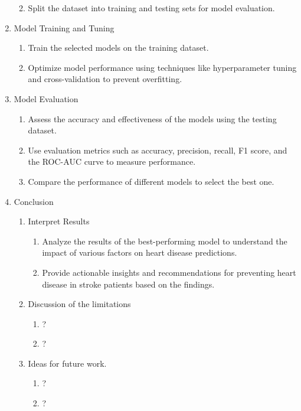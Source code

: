 \documentclass[runningheads]{llncs}
\begin{document}
\begin{enumerate}
\begin{enumerate}
\begin{enumerate}
            \end{enumerate}
        \item Split the dataset into training and testing sets for model evaluation. 
    \end{enumerate}
\item Model Training and Tuning
    \begin{enumerate}
        \item Train the selected models on the training dataset. 
        \item Optimize model performance using techniques like hyperparameter tuning and cross-validation to prevent overfitting. 
    \end{enumerate}
\item Model Evaluation
\begin{enumerate}
    \item Assess the accuracy and effectiveness of the models using the testing dataset. 
    \item Use evaluation metrics such as accuracy, precision, recall, F1 score, and the ROC-AUC curve to measure performance. 
    \item Compare the performance of different models to select the best one. 
\end{enumerate}
\item Conclusion
\begin{enumerate}
    \item Interpret Results
        \begin{enumerate}
            \item Analyze the results of the best-performing model to understand the impact of various factors on heart disease predictions. 
            \item Provide actionable insights and recommendations for preventing heart disease in stroke patients based on the findings. 
        \end{enumerate}
\item Discussion of the limitations
    \begin{enumerate}
        \item ?
        \item ?
    \end{enumerate}
\item Ideas for future work.
    \begin{enumerate}
        \item ?
        \item ?
    \end{enumerate}
\end{enumerate}




\end{enumerate}
\end{document}
